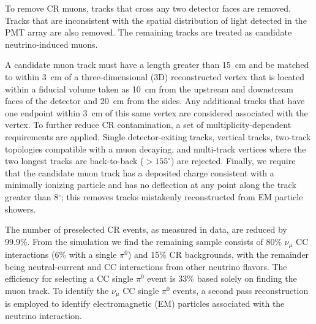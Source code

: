 \documentclass[%
 reprint,
superscriptaddress,
amsmath,amssymb,
prl,
floatfix,
]{revtex4-1}
\newcommand{\numu}{\nu_{\mu}}
\newcommand{\pio}{\pi^{0}}
\begin{document}
To remove CR muons, tracks that cross any two detector faces are removed. Tracks that are inconsistent with the spatial distribution of light detected in the PMT array are also removed. The remaining tracks are treated as candidate neutrino-induced muons.

A candidate muon track must have a length greater than 15~cm and be matched to within 3~cm of a three-dimensional (3D) reconstructed vertex that is located within a fiducial volume taken as 10~cm from the upstream and downstream faces of the detector and 20~cm from the sides. Any additional tracks that have one endpoint within 3~cm of this same vertex are considered associated with the vertex. 
To further reduce CR contamination, a set of multiplicity-dependent requirements are applied. Single detector-exiting tracks, vertical tracks, two-track topologies compatible with a muon decaying, and multi-track vertices where the two longest tracks are back-to-back ($>155^{\circ}$) are rejected. Finally, we require that the candidate muon track has a deposited charge consistent with a minimally ionizing particle and has no deflection at any point along the track greater than 8$^{\circ}$; this removes tracks mistakenly reconstructed from EM particle showers.

The number of preselected CR events, as measured in data, are reduced by 99.9\%. From the simulation we find the remaining sample consists of 80\% $\numu$ CC interactions (6\% with a single $\pio$) and 15\% CR backgrounds, with the remainder being neutral-current and CC interactions from other neutrino flavors. The efficiency for selecting a CC single $\pio$ event is 33\% based solely on finding the muon track. To identify the $\numu$ CC single $\pio$ events, a second pass reconstruction is employed to identify electromagnetic (EM) particles associated with the neutrino interaction.
\end{document}

